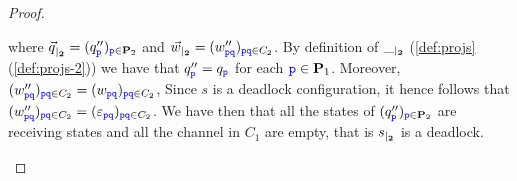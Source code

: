 \begin{proof}
\begin{description}
\begin{description}
where $\restrict{\vec{q}}{2} = (q''_\ttp)_{\ttp\in\roles_2}$
and $\restrict{\vec{w}}{2} = (w''_{\ttp\ttq})_{\ttp\ttq\in C_2}$.
By definition of $\restrict{\_}{2}$ (\cref{def:projs}(\ref{def:projs-2}))
we have that $q''_\ttp = q_\ttp$ for each $\ttp\in\roles_1$.
Moreover, $(w''_{\ttp\ttq})_{\ttp\ttq\in C_2} =  (w_{\ttp\ttq})_{\ttp\ttq\in C_2}$,
Since $s$ is a deadlock configuration, it hence follows that  $(w''_{\ttp\ttq})_{\ttp\ttq\in C_2} =  (\varepsilon_{\ttp\ttq})_{\ttp\ttq\in C_2}$.
We have then that all the states of $(q''_\ttp)_{\ttp\in\roles_2}$ are receiving states
and all the channel in $C_1$ are empty, that is $\restrict{s}{2}$ is a deadlock.
\end{description}
 \end{description}
 \end{proof}

